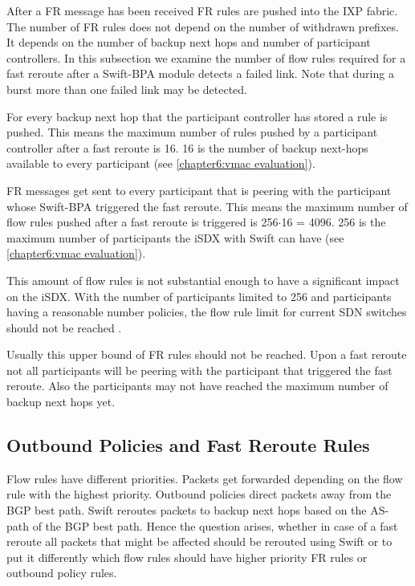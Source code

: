 After a FR message has been received FR rules are pushed into the IXP fabric. The number of FR rules does not depend on the number of withdrawn prefixes. It depends on the number of backup next hops and number of participant controllers. 
In this subsection we examine the number of flow rules required for a fast reroute after a Swift-BPA module detects a failed link. Note that during a burst more than one failed link may be detected. 

For every backup next hop that the participant controller has stored a rule is pushed. This means the maximum number of rules pushed by a participant controller after a fast reroute is 16. 16 is the number of backup next-hops available to every participant (see \ref{chapter6:vmac evaluation}).

FR messages get sent to every participant that is peering with the participant whose Swift-BPA triggered the fast reroute. This means the maximum number of flow rules pushed after a fast reroute is triggered is 256$\cdot$16 = 4096. 256 is the maximum number of participants the iSDX with Swift can have (see \ref{chapter6:vmac evaluation}).

This amount of flow rules is not substantial enough to have a significant impact on the iSDX. With the number of participants limited to 256 and participants having a reasonable number policies, the flow rule limit for current SDN switches should not be reached \cite[Figure 3 (a)]{gupta2016industrial}.

Usually this upper bound of FR rules should not be reached. Upon a fast reroute not all participants will be peering with the participant that triggered the fast reroute. Also the participants may not have reached the maximum number of backup next hops yet.

\subsection{\label{chapter6:number of flow rules:outbound_FR}Outbound Policies and Fast Reroute Rules}

Flow rules have different priorities. Packets get forwarded depending on the flow rule with the highest priority. 
Outbound policies direct packets away from the BGP best path. Swift reroutes packets to backup next hops based on the AS-path of the BGP best path. Hence the question arises, whether in case of a fast reroute all packets that might be affected should be rerouted using Swift or to put it differently which flow rules should have higher priority FR rules or outbound policy rules.

